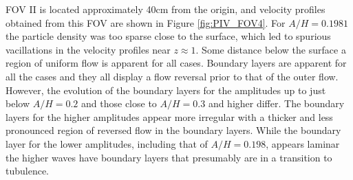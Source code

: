 \documentclass[review]{elsarticle}
\begin{document}
FOV II is located approximately 40cm from the origin, and velocity 
profiles obtained from this FOV are shown in Figure \ref{fig:PIV_FOV4}.
For $A/H=0.1981$ the particle density was too sparse close to the surface, which led to spurious vacillations in the velocity profiles near  $z\approx1$. Some distance below the surface a region of uniform flow is apparent for all cases. 
Boundary layers are apparent for all the cases and they all
display a flow reversal prior to that of the outer flow.
However, the evolution of the boundary layers for the amplitudes up to just below
$A/H=0.2$ and those close to $A/H=0.3$ and higher differ.
The boundary layers for the higher amplitudes appear more irregular
with a thicker and less pronounced region of reversed flow in the 
boundary layers.  
While the boundary layer for the lower amplitudes, including that of $A/H=0.198$, appears laminar the higher waves have boundary layers that 
presumably are in a transition to tubulence.   
\end{document}
